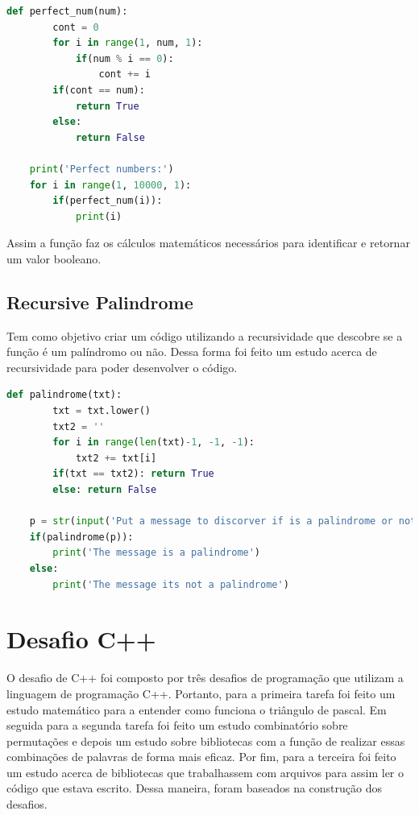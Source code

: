 \begin{lstlisting}[language=python]
    def perfect_num(num):
        cont = 0
        for i in range(1, num, 1): 
            if(num % i == 0):
                cont += i
        if(cont == num):
            return True
        else:
            return False

    print('Perfect numbers:')
    for i in range(1, 10000, 1):
        if(perfect_num(i)):
            print(i)
\end{lstlisting}

Assim a função faz os cálculos matemáticos necessários para identificar e retornar um valor booleano.


\subsection{Recursive Palindrome}

Tem como objetivo criar um código utilizando a recursividade que descobre se a função é um palíndromo ou não. Dessa forma foi feito um estudo acerca de recursividade \cite{Recursiv41:online} para poder desenvolver o código.

\begin{lstlisting}[language=python]
    def palindrome(txt):
        txt = txt.lower()
        txt2 = ''
        for i in range(len(txt)-1, -1, -1):
            txt2 += txt[i]
        if(txt == txt2): return True
        else: return False

    p = str(input('Put a message to discorver if is a palindrome or not: '))
    if(palindrome(p)):
        print('The message is a palindrome')
    else:
        print('The message its not a palindrome')

\end{lstlisting}


\section{Desafio C++}

O desafio de C++ foi composto por três desafios de programação que utilizam a linguagem de programação C++. Portanto, para a primeira tarefa foi feito um estudo matemático para a entender como funciona o triângulo de pascal. Em seguida para a segunda tarefa foi feito um estudo combinatório sobre permutações e depois um estudo sobre bibliotecas  com a função de realizar essas combinações de palavras de forma mais eficaz. Por fim, para a terceira foi feito um estudo acerca de bibliotecas que trabalhassem com arquivos para assim ler o código que estava escrito. Dessa maneira, foram baseados na construção dos desafios.

